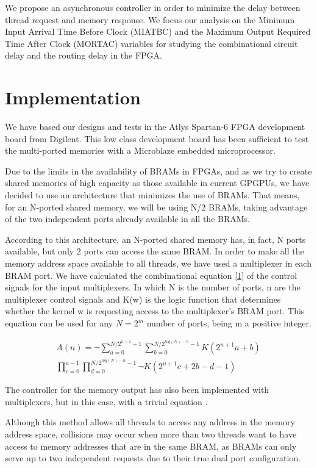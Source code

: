 \documentclass[conference,a4paper]{IEEEtran}
\begin{document}
We propose an asynchronous controller in order to minimize the delay between thread request and memory response. We focus our analysis on the Minimum Input Arrival Time Before Clock (MIATBC) and the Maximum Output Required Time After Clock (MORTAC) variables for studying the combinational circuit delay and the routing delay in the FPGA.



\vspace{7pt}
\section{Implementation}
We have based our designs and tests in the Atlys Spartan-6 FPGA development board from Digilent. This low class development board has been sufficient to test the multi-ported memories with a Microblaze embedded microprocessor.

Due to the limits in the availability of BRAMs in FPGAs, and as we try to create shared memories of high capacity as those available in current GPGPUs, we have decided to use an architecture that minimizes the use of BRAMs. That means, for an N-ported shared memory, we will be using N/2 BRAMs, taking advantage of the two independent ports already available in all the BRAMs.

According to this architecture, an N-ported shared memory has, in fact, N ports available, but only 2 ports can access the same BRAM. In order to make all the memory address space available to all threads, we have used a multiplexer in each BRAM port. We have calculated the combinational equation \eqref{1} of the control signals for the input multiplexers. In which N is the number of ports, n are the multiplexer control signals and K(w) is the logic function that determines whether the kernel w is requesting access to the multiplexer’s BRAM port. This equation can be used for any $N=2^m$ number of ports, being m a positive integer.

\begin{multline} \label{1}
  A(n) = \neg \sum_{a=0}^{N/2^{n+1}-1}
         \sum_{b=0}^{N/2^{log(N)-n}-1} K(2^{n+1}a+b) \\
         \prod_{c=0}^{a-1}
         \prod_{d=0}^{N/2^{log(N)-n}-1} \neg K(2^{n+1}c+2b-d-1)
\end{multline}

The controller for the memory output has also been implemented with multiplexers, but in this case, with a trivial equation \cite{Source}.

Although this method allows all threads to access any address in the memory address space, collisions may occur when more than two threads want to have access to memory addresses that are in the same BRAM, as BRAMs can only serve up to two independent requests due to their true dual port configuration.
\end{document}
